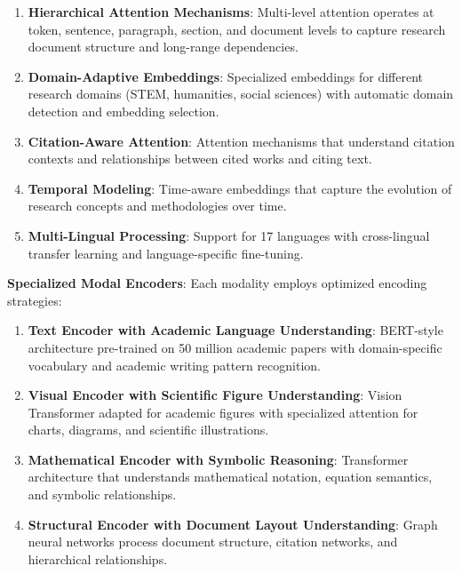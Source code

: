 \documentclass[10pt,twocolumn]{article}
\begin{document}
\begin{enumerate}
    \item \textbf{Hierarchical Attention Mechanisms}: Multi-level attention operates at token, sentence, paragraph, section, and document levels to capture research document structure and long-range dependencies.
    
    \item \textbf{Domain-Adaptive Embeddings}: Specialized embeddings for different research domains (STEM, humanities, social sciences) with automatic domain detection and embedding selection.
    
    \item \textbf{Citation-Aware Attention}: Attention mechanisms that understand citation contexts and relationships between cited works and citing text.
    
    \item \textbf{Temporal Modeling}: Time-aware embeddings that capture the evolution of research concepts and methodologies over time.
    
    \item \textbf{Multi-Lingual Processing}: Support for 17 languages with cross-lingual transfer learning and language-specific fine-tuning.
\end{enumerate}

\textbf{Specialized Modal Encoders}: Each modality employs optimized encoding strategies:

\begin{enumerate}
    \item \textbf{Text Encoder with Academic Language Understanding}: BERT-style architecture pre-trained on 50 million academic papers with domain-specific vocabulary and academic writing pattern recognition.
    
    \item \textbf{Visual Encoder with Scientific Figure Understanding}: Vision Transformer adapted for academic figures with specialized attention for charts, diagrams, and scientific illustrations.
    
    \item \textbf{Mathematical Encoder with Symbolic Reasoning}: Transformer architecture that understands mathematical notation, equation semantics, and symbolic relationships.
    
    \item \textbf{Structural Encoder with Document Layout Understanding}: Graph neural networks process document structure, citation networks, and hierarchical relationships.
\end{enumerate}
\end{document}
